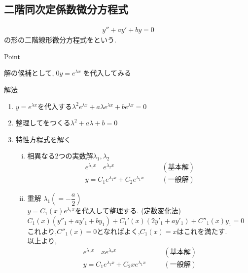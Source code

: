 \documentclass[a4paper]{jsarticle}
\begin{document}
\subsection{二階同次定係数微分方程式}
\begin{eqnarray*}
    y''+ay'+by=0
\end{eqnarray*}
の形の二階線形微分方程式をという.
\begin{itembox}[l]{Point}
    \begin{center}
        解の候補として,$\;0y=e^{\lambda x}\;$を代入してみる
    \end{center}
\end{itembox}
\begin{itembox}[l]{解法}
    \begin{enumerate}[(1)]
        \item $y=e^{\lambda x}$を代入する\quad$\lambda^2 e^{\lambda x}+a\lambda e^{\lambda x}+b e^{\lambda x}=0$
        \item 整理してをつくる\quad$\lambda^2+a\lambda+b=0$
        \item 特性方程式を解く
              \begin{enumerate}[(i)]
                  \item 相異なる2つの実数解$\lambda_1,\lambda_2$
                        \begin{eqnarray*}
                            e^{\lambda_1x}\quad e^{\lambda_2x}\quad &&(基本解)\\
                            y=C_1 e^{\lambda_1x}+C_2e^{\lambda_1x}\quad &&(一般解)
                        \end{eqnarray*}
                  \item 重解 $\lambda_1\left(=-\dfrac{a}{2}\right)$\\
                        $y=C_1\left(x\right) e^{\lambda_1x}$を代入して整理する. (定数変化法)\\
                        $C_1\left(x\right)\left(y''_1+ay'_1+by_1\right)+C_1'\left(x\right)\left(2y'_1+ay'_1\right)+C''_1\left(x\right)y_1=0$\\
                        これより,$C''_1\left(x\right)=0$となればよく,$C_1\left(x\right)=x$はこれを満たす.\\
                        以上より,
                        \begin{eqnarray*}
                            e^{\lambda_1x}\quad xe^{\lambda_2x}\quad &&(基本解)\\
                            y=C_1 e^{\lambda_1x}+C_2xe^{\lambda_1x}\quad &&(一般解)

\end{eqnarray*}
\end{enumerate}
\end{enumerate}
\end{itembox}
\end{document}
